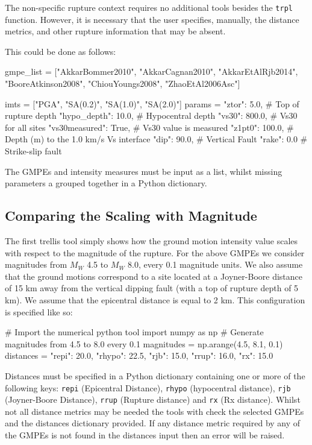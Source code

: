 The non-specific rupture context requires no additional tools besides the \verb=trpl= function. However, it is necessary that the user specifies, manually, the distance metrics, and other rupture information that may be absent.

This could be done as follows:

\begin{python}[frame=single]
gmpe_list = ["AkkarBommer2010", 
             "AkkarCagnan2010", 
             "AkkarEtAlRjb2014", 
             "BooreAtkinson2008", 
             "ChiouYoungs2008",
             "ZhaoEtAl2006Asc"]

imts = ["PGA", "SA(0.2)", "SA(1.0)", "SA(2.0)"]
params = {"ztor": 5.0,   # Top of rupture depth
         "hypo_depth": 10.0,   # Hypocentral depth
         "vs30": 800.0, # Vs30 for all sites
         "vs30measured": True, # Vs30 value is measured
         "z1pt0": 100.0, # Depth (m) to the 1.0 km/s Vs interface 
         "dip": 90.0,  # Vertical Fault
         "rake": 0.0 # Strike-slip fault
         }
\end{python}

The GMPEs and intensity measures must be input as a list, whilst missing parameters a grouped together in a Python dictionary.

\subsection{Comparing the Scaling with Magnitude}

The first trellis tool simply shows how the ground motion intensity value scales with respect to the magnitude of the rupture. For the above GMPEs we consider magnitudes from $M_W$ 4.5 to $M_W$ 8.0, every 0.1 magnitude units. We also assume that the ground motions correspond to a site located at a Joyner-Boore distance of 15 km away from the vertical dipping fault (with a top of rupture depth of 5 km). We assume that the epicentral distance is equal to 2 km. This configuration is specified like so:

\begin{python}
# Import the numerical python tool
import numpy as np
# Generate magnitudes from 4.5 to 8.0 every 0.1
magnitudes = np.arange(4.5, 8.1, 0.1)
distances = {"repi": 20.0,
             "rhypo": 22.5,
             "rjb": 15.0,
             "rrup": 16.0,
             "rx": 15.0}
\end{python}

Distances must be specified in a Python dictionary containing one or more of the following keys: \verb=repi= (Epicentral Distance), \verb=rhypo= (hypocentral distance), \verb=rjb= (Joyner-Boore Distance), \verb=rrup= (Rupture distance) and \verb=rx= (Rx distance). Whilst not all distance metrics may be needed the tools with check the selected GMPEs and the distances dictionary provided. If any distance metric required by any of the GMPEs is not found in the distances input then an error will be raised.

